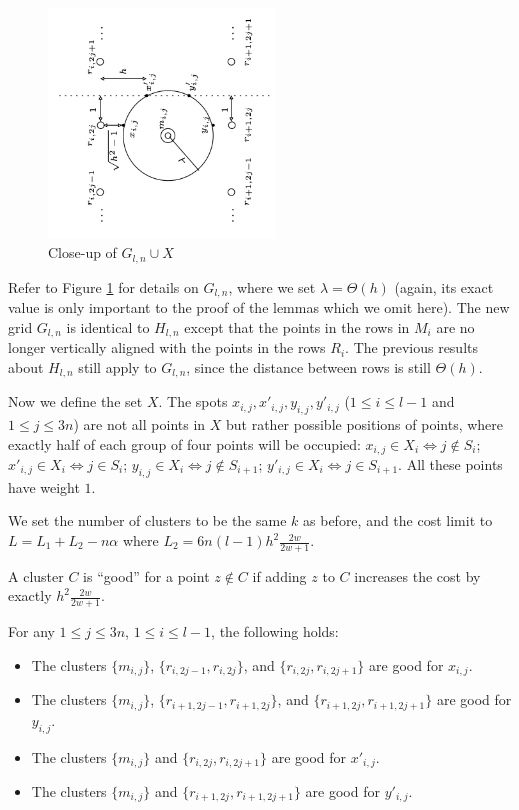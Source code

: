 \begin{figure}
    \centering
    \includegraphics[width=6cm]{chapter_1/files/vattani_fig2.png}
\centering
    \caption{Close-up of $G_{l,n}\cup X$ \cite{vattani}}
    \label{fig:vattani2}
\end{figure}

Refer to Figure \ref{fig:vattani2} for details on $G_{l,n}$, where we set $\lambda=\Theta(h)$ (again, its exact value is only important to the proof of the lemmas which we omit here). The new grid $G_{l,n}$ is identical to $H_{l,n}$ except that the points in the rows in $M_i$ are no longer vertically aligned with the points in the rows $R_i$. The previous results about $H_{l,n}$ still apply to $G_{l,n}$, since the distance between rows is still $\Theta(h)$.

Now we define the set $X$. The spots $x_{i,j},x'_{i,j},y_{i,j},y'_{i,j}$ ($1\le i \le l-1$ and $1 \le j \le 3n$) are not all points in $X$ but rather possible positions of points, where exactly half of each group of four points will be occupied: $x_{i,j}\in X_i\iff j\not\in S_i$; $x'_{i,j}\in X_i\iff j\in S_i$; $y_{i,j}\in X_i\iff j\not\in S_{i+1}$; $y'_{i,j}\in X_i\iff j\in S_{i+1}$. All these points have weight $1$.

We set the number of clusters to be the same $k$ as before, and the cost limit to $L=L_1+L_2-n\alpha$ where $L_2=6n(l-1)h^2\frac{2w}{2w+1}$.

\begin{definition}\label{def3}
A cluster $C$ is ``good'' for a point $z\not\in C$ if adding $z$ to $C$ increases the cost by exactly $h^2\frac{2w}{2w+1}$.
\end{definition}

\begin{lemma}\label{lem3}
For any $1\le j \le 3n$, $1\le i \le l-1$, the following holds:
\begin{itemize}
    \item The clusters $\{m_{i,j}\}$, $\{r_{i,2j-1},r_{i,2j}\}$, and $\{r_{i,2j},r_{i,2j+1}\}$ are good for $x_{i,j}$.
    \item The clusters $\{m_{i,j}\}$, $\{r_{i+1,2j-1},r_{i+1,2j}\}$, and $\{r_{i+1,2j},r_{i+1,2j+1}\}$ are good for $y_{i,j}$.
    \item The clusters $\{m_{i,j}\}$ and $\{r_{i,2j},r_{i,2j+1}\}$ are good for $x'_{i,j}$.
    \item The clusters $\{m_{i,j}\}$ and $\{r_{i+1,2j},r_{i+1,2j+1}\}$ are good for $y'_{i,j}$.
\end{itemize}
\end{lemma}

